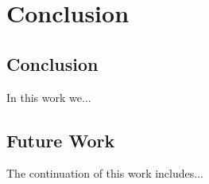 
\chapter{Conclusion}
\label{ch:conclusions}

\section{Conclusion}
In this work we...

\section{Future Work}
The continuation of this work includes...
